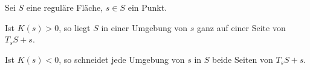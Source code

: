 \begin{bemerkung}%
    Sei $S$ eine reguläre Fläche, $s \in S$ ein Punkt.
    \begin{bemenum}
        \item Ist $K(s) > 0$, so liegt $S$ in einer Umgebung von $s$
              ganz auf einer Seite von $T_s S + s$.
        \item Ist $K(s) < 0$, so schneidet jede Umgebung von $s$ in $S$
              beide Seiten von $T_s S + s$.
    \end{bemenum}
\end{bemerkung}
